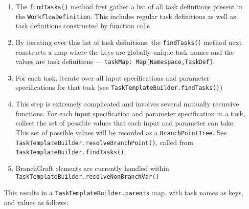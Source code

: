 \documentclass{report}
\begin{document}
\begin{enumerate}

\item The \texttt{findTasks()} method first gather a list of all task definitions present in the \texttt{WorkflowDefinition}. This includes regular task definitions as well as task definitions constructed by function calls.

\item By iterating over this list of task definitions, the \texttt{findTasks()} method next constructs a map where 
      the keys are globally unique task names and 
      the values are task definitions --- \texttt{taskMap: Map[Namespace,TaskDef]}.

\item For each task, iterate over all input specifications and parameter specifications for that task
      (see \texttt{TaskTemplateBuilder.findTasks()})

\item This step is extremely complicated and involves several mutually recursive functions.
      For each input specification and parameter specification in a task, 
      collect the set of possible values that each input and parameter can take. 
      This set of possible values will be recorded as a \texttt{BranchPointTree}.
      See \texttt{TaskTemplateBuilder.resolveBranchPoint()}, called from \texttt{TaskTemplateBuilder.findTasks()}.
      
\item BranchGraft elements are currently handled within \texttt{TaskTemplateBuilder.resolveNonBranchVar()}

\end{enumerate}

This results in a \texttt{TaskTemplateBuilder.parents} map, with task names as keys, and values as follows:
\end{document}
